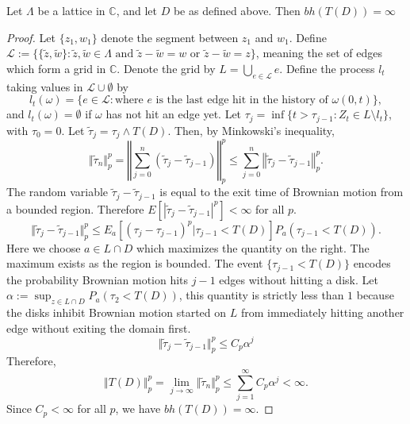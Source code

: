 \documentclass[10pt,a4paper]{amsart}
\newcommand{\CC}{\mathbb{C}}
\newcommand{\C}{\mathbb{C}}
\newcommand{\mc}{\mathcal}
\newcommand{\til}{\tilde}
\begin{document}
\begin{theorem}\label{lattice}
    Let $\Lambda$ be a lattice in $\C$, and let $D$ be as defined above. Then $bh(T(D)) = \infty$
\end{theorem}

\begin{proof}
    Let $\{z_1, w_1\}$ denote the segment between 
$z_1$ and $w_1$.
Define $\mc{L} := \{\{\tilde z, \tilde w\}: \tilde z, \tilde w \in \Lambda \text{ and } \tilde z - \tilde w = w \text{ or }\tilde z - \tilde w = z\}$,
meaning the set of edges which form a grid in $\CC$.
Denote the grid by $L = \bigcup_{e \in \mc{L}}e$. Define the process $l_t$ taking values in $\mc{L}\cup \emptyset$ by
$$
    l_t(\omega) = \{e\in\mc{L}: \text{where $e$ is the last edge hit in the history of $\omega(0,t)$}\},
$$
and $l_t(\omega) = \emptyset$ if $\omega$ has not hit an edge yet.
Let $\tau_j = \inf\{t>\tau_{j-1}: Z_t \in L \setminus l_t\}$, with $\tau_0 = 0$. Let $\tilde \tau_j = \tau_j \wedge T(D)$. Then, by Minkowski's inequality,
$$
    \Vert \tilde \tau_n \Vert_p^p = \left\Vert \sum_{j=0}^n (\tilde\tau_j - \tilde\tau_{j-1})\right\Vert_p^p\leq
      \sum_{j=0}^n \left\Vert\tilde\tau_j - \tilde\tau_{j-1}\right\Vert_p^p.
$$
The random variable $\til\tau_j - \til \tau_{j-1}$ is equal to the exit time of Brownian motion from a bounded region. Therefore
$E[|\til\tau_j - \til \tau_{j-1}|^p]<\infty$ for all $p$. 
$$
    \Vert\til\tau_j - \til \tau_{j-1}\Vert_p^p \leq E_a[(\tau_j - \tau_{j-1})^p|\tau_{j-1} < T(D)] P_a(\tau_{j-1} < T(D)).
$$
Here we choose $a\in L\cap D$ which maximizes the quantity on the right. The maximum exists as the region is bounded. The event $\{\tau_{j-1} < T(D)\}$ encodes the probability 
Brownian motion hits $j-1$ edges
without hitting a disk. Let $\alpha := \sup_{z\in L\cap D}P_a(\tau_2 < T(D))$, 
this quantity is strictly less than $1$ because the disks inhibit Brownian motion
started on $L$ from immediately hitting another edge without exiting the domain first.
$$
    \Vert\til\tau_j - \til \tau_{j-1}\Vert_p^p \leq C_p \alpha^j
$$
Therefore,
$$
   \Vert T(D)\Vert_p^p = \lim_{j\to\infty} \Vert \til \tau_n \Vert_p^p \leq \sum_{j=1}^\infty C_p \alpha^j  < \infty.
$$
Since $C_p<\infty$ for all $p$, we have $bh(T(D)) = \infty$.
\end{proof}
\end{document}
